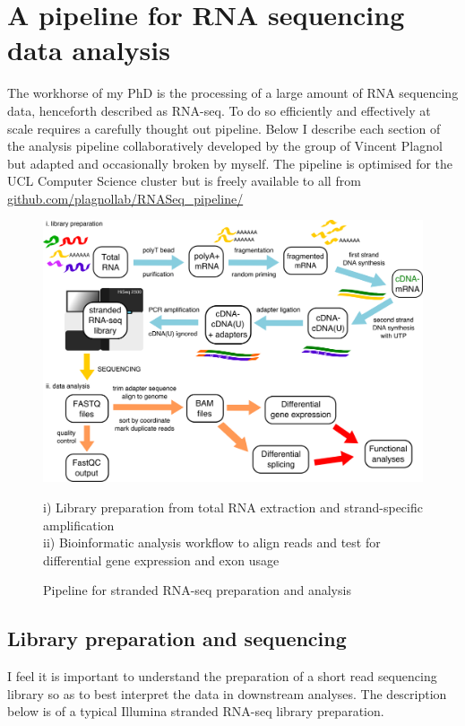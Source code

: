 
\chapter{A pipeline for RNA sequencing data analysis}


The workhorse of my PhD is the processing of a large amount of RNA sequencing data, henceforth described as RNA-seq. To do so efficiently and effectively at scale requires a carefully thought out pipeline. Below I describe each section of the analysis pipeline collaboratively developed by the group of Vincent Plagnol but adapted and occasionally broken by myself. The pipeline is optimised for the UCL Computer Science cluster but is freely available to all from \url{github.com/plagnollab/RNASeq_pipeline/}

\begin{figure}[h!]
	\begin{center}
		\includegraphics[width=14cm]{Figures/02_methods/RNAseq_pipeline_schematic.png}
	\end{center}
	\caption{Pipeline for stranded RNA-seq preparation and analysis}
	i) Library preparation from total RNA extraction and strand-specific amplification\\
	ii) Bioinformatic analysis workflow to align reads and test for differential gene expression and exon usage
\end{figure}

\section{Library preparation and sequencing}
I feel it is important to understand the preparation of a short read sequencing library so as to best interpret the data in downstream analyses. The description below is of a typical Illumina stranded RNA-seq library preparation.

